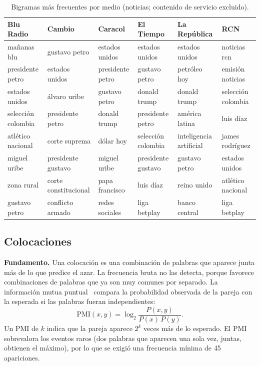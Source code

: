 \documentclass[10pt,twocolumn]{article}
\begin{document}
\begin{table}[t]
\centering\small
\caption{Bigramas más frecuentes por medio (noticias; contenido de servicio excluido).}
\label{tab:ngramas}
\begin{tabular}{llllll}
\toprule
Blu Radio & Cambio & Caracol & El Tiempo & La República & RCN\\
\midrule
mañanas blu        & gustavo petro        & estados unidos   & estados unidos            & estados unidos          & noticias rcn\\
presidente petro   & estados unidos       & presidente petro & gustavo petro             & petróleo hoy            & emisión noticias\\
estados unidos     & álvaro uribe         & gustavo petro    & donald trump              & donald trump            & selección colombia\\
selección colombia & presidente petro     & donald trump     & presidente petro          & américa latina          & luis díaz\\
atlético nacional  & corte suprema        & dólar hoy        & selección colombia        & inteligencia artificial & james rodríguez\\
miguel uribe       & presidente gustavo   & miguel uribe     & presidente gustavo        & gustavo petro           & estados unidos\\
zona rural         & corte constitucional & papa francisco   & luis díaz                 & reino unido             & atlético nacional\\
gustavo petro      & conflicto armado     & redes sociales   & liga betplay              & banco central           & liga betplay\\
\bottomrule
\end{tabular}
\end{table}

\subsection{Colocaciones}

\textbf{Fundamento.} Una colocación es una combinación de palabras que
aparece junta más de lo que predice el azar. La frecuencia bruta no las
detecta, porque favorece combinaciones de palabras que ya son muy comunes por
separado. La información mutua puntual~\cite{church1990} compara la
probabilidad observada de la pareja con la esperada si las palabras fueran
independientes:
\begin{equation}
\mathrm{PMI}(x,y)=\log_2\frac{P(x,y)}{P(x)\,P(y)}.
\end{equation}
Un PMI de $k$ indica que la pareja aparece $2^k$ veces más de lo esperado. El
PMI sobrevalora los eventos raros (dos palabras que aparecen una sola vez,
juntas, obtienen el máximo), por lo que se exigió una frecuencia mínima de
45 apariciones.
\end{document}
